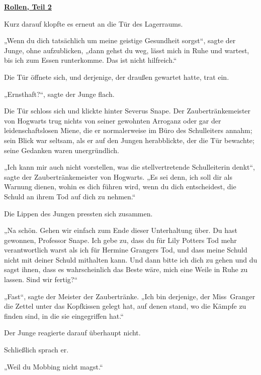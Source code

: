 

\hypertarget{rollen-teil-2}{%

\textbf{\uline{Rollen, Teil 2}}

Kurz darauf klopfte es erneut an die Tür des Lagerraums.

„Wenn du dich tatsächlich um meine geistige Gesundheit sorgst“, sagte der Junge, ohne aufzublicken, „dann gehst du weg, lässt mich in Ruhe und wartest, bis ich zum Essen runterkomme. Das ist nicht hilfreich.“

Die Tür öffnete sich, und derjenige, der draußen gewartet hatte, trat ein.

„Ernsthaft?“, sagte der Junge flach.

Die Tür schloss sich und klickte hinter Severus Snape. Der Zaubertränkemeister von Hogwarts trug nichts von seiner gewohnten Arroganz oder gar der leidenschaftslosen Miene, die er normalerweise im Büro des Schulleiters annahm; sein Blick war seltsam, als er auf den Jungen herabblickte, der die Tür bewachte; seine Gedanken waren unergründlich.

„Ich kann mir auch nicht vorstellen, was die stellvertretende Schulleiterin denkt“, sagte der Zaubertränkemeister von Hogwarts. „Es sei denn, ich soll dir als Warnung dienen, wohin es dich führen wird, wenn du dich entscheidest, die Schuld an ihrem Tod auf dich zu nehmen.“

Die Lippen des Jungen pressten sich zusammen.

„Na schön. Gehen wir einfach zum Ende dieser Unterhaltung über. Du hast gewonnen, Professor Snape. Ich gebe zu, dass du für Lily Potters Tod mehr verantwortlich warst als ich für Hermine Grangers Tod, und dass meine Schuld nicht mit deiner Schuld mithalten kann. Und dann bitte ich dich zu gehen und du sagst ihnen, dass es wahrscheinlich das Beste wäre, mich eine Weile in Ruhe zu lassen. Sind wir fertig?“

„Fast“, sagte der Meister der Zaubertränke. „Ich bin derjenige, der Miss~Granger die Zettel unter das Kopfkissen gelegt hat, auf denen stand, wo die Kämpfe zu finden sind, in die sie eingegriffen hat.“

Der Junge reagierte darauf überhaupt nicht.

Schließlich sprach er.

„Weil du Mobbing nicht magst.“

}

